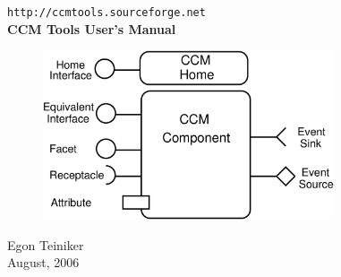 \begin{titlepage}
\begin{center}

  	\vspace*{3cm}
  	{\LARGE \tt http://ccmtools.sourceforge.net} \\
  	\vspace{2cm}
  	{\huge \bf CCM Tools User's Manual} \\
  	\vspace{15mm}

	\begin{figure}[htbp]
		\begin{center}
			\includegraphics[height=5cm,angle=0] {figures/CCMSymbol}
	  	\end{center}
	\end{figure}
  	
  	\vspace{1cm}
  	{\LARGE Egon Teiniker} \\
  	
  	\vspace{15mm}
  	{\large August, 2006} 

\end{center}
\end{titlepage}